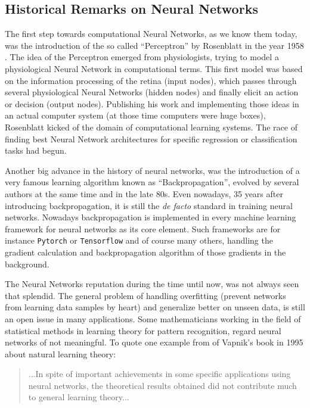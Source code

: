 
\subsection{Historical Remarks on Neural Networks}\label{sec:prev_nn_history}
The first step towards computational Neural Networks, as we know them today, was the introduction of the so called \enquote{Perceptron} by Rosenblatt in the year 1958 \cite{Rosenblatt1958}. 
The idea of the Perceptron emerged from physiologists, trying to model a physiological Neural Network in computational terms. 
This first model was based on the information processing of the retina (input nodes), which passes through several physiological Neural Networks (hidden nodes) and finally elicit an action or decision (output nodes).
Publishing his work and implementing those ideas in an actual computer system (at those time computers were huge boxes), Rosenblatt kicked of the domain of computational learning systems.
The race of finding best Neural Network architectures for specific regression or classification tasks had begun.

Another big advance in the history of neural networks, was the introduction of a very famous learning algorithm known as \enquote{Backpropagation}, evolved by several authors at the same time \cite{LeCun1986} and \cite{Rumelhart1986} in the late 80s. 
Even nowadays, 35 years after introducing backpropagation, it is still the \emph{de facto} standard in training neural networks.
Nowadays backpropagation is implemented in every machine learning framework for neural networks as its core element.
Such frameworks are for instance \texttt{Pytorch} or \texttt{Tensorflow} and of course many others, handling the gradient calculation and backpropagation algorithm of those gradients in the background.

The Neural Networks reputation during the time until now, was not always seen that splendid.
The general problem of handling overfitting (prevent networks from learning data samples by heart) and generalize better on unseen data, is still an open issue in many applications.
Some mathematicians working in the field of statistical methods in learning theory for pattern recognition, regard neural networks of not meaningful.
To quote one example from \cite{Vapnik1995} of Vapnik's book in 1995 about natural learning theory:

\begin{quote}
...In spite of important achievements in some specific applications using neural networks, the theoretical results obtained did not contribute much to general learning theory...
\end{quote}

